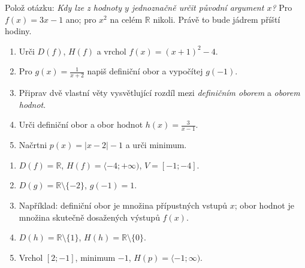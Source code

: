 \documentclass[11pt,a4paper]{article}
\begin{document}
Polož otázku: \emph{Kdy lze z hodnoty $y$ jednoznačně určit původní argument $x$?} Pro $f(x)=3x-1$ ano; pro $x^2$ na celém $\mathbb R$ nikoli. Právě to bude jádrem příští hodiny.

\begin{zadaniReseniBox}[title={Domácí úkol}]
\begin{enumerate}[label=\alph*)]
\item Urči $D(f)$, $H(f)$ a vrchol $f(x)=(x+1)^2-4$.
\item Pro $g(x)=\frac1{x+2}$ napiš definiční obor a vypočítej $g(-1)$.
\item Připrav dvě vlastní věty vysvětlující rozdíl mezi \emph{definičním oborem} a \emph{oborem hodnot}.
\item Urči definiční obor a obor hodnot $h(x)=\frac{3}{x-1}$.
\item Načrtni $p(x)=|x-2|-1$ a urči minimum.
\end{enumerate}
\tcblower
\begin{enumerate}[label=\alph*)]
\item $D(f)=\mathbb R$, $H(f)=\langle-4;+\infty)$, $V=[-1;-4]$.
\item $D(g)=\mathbb R\setminus\{-2\}$, $g(-1)=1$.
\item Například: definiční obor je množina přípustných vstupů $x$; obor hodnot je množina skutečně dosažených výstupů $f(x)$.
\item $D(h)=\mathbb R\setminus\{1\}$, $H(h)=\mathbb R\setminus\{0\}$.
\item Vrchol $[2;-1]$, minimum $-1$, $H(p)=\langle-1;\infty)$.
\end{enumerate}
\end{zadaniReseniBox}
\end{document}
